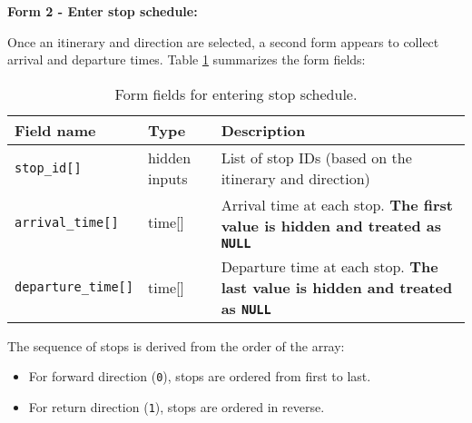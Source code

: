 \documentclass[a4paper, 12pt]{article}
\begin{document}
\textbf{Form 2 - Enter stop schedule:}

Once an itinerary and direction are selected, a second form appears to collect arrival and departure times.  Table \ref{tab:p3-t7-stop-timing-form} summarizes the form fields:

\begin{table}[H]
    \centering
    \footnotesize
    \caption{Form fields for entering stop schedule.}
    \label{tab:p3-t7-stop-timing-form}
    \begin{tabular}{llp{10cm}}
        \toprule
        \textbf{Field name} & \textbf{Type} & \textbf{Description} \\
        \midrule
        \texttt{stop\_id[]} & hidden inputs & List of stop IDs (based on the itinerary and direction) \\
        \texttt{arrival\_time[]} & time[] & Arrival time at each stop. \textbf{The first value is hidden and treated as \texttt{NULL}} \\
        \texttt{departure\_time[]} & time[] & Departure time at each stop. \textbf{The last value is hidden and treated as \texttt{NULL}} \\
        \bottomrule
    \end{tabular}
\end{table}

The sequence of stops is derived from the order of the array:
\begin{itemize}
    \item For forward direction (\texttt{0}), stops are ordered from first to last.
    \item For return direction (\texttt{1}), stops are ordered in reverse.
\end{itemize}
\end{document}
